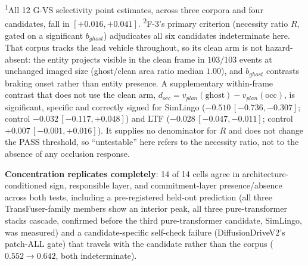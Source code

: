 \begin{table}[t]
\centering
\caption{Portability across a structurally different scenario (lead-vehicle braking) and
an independently collected data source (NAVSIM).}
\label{tab:generality}
\scriptsize
{}

\vspace{4pt}
{\scriptsize\textsuperscript{1}All 12 G-VS selectivity point estimates, across three corpora and four candidates, fall in $[+0.016,+0.041]$. \textsuperscript{2}F-3's primary criterion (necessity ratio $R$, gated on a significant $b_{ghost}$) adjudicates all six candidates indeterminate here. That corpus tracks the lead vehicle throughout, so its clean arm is not hazard-absent: the entity projects visible in the clean frame in $103/103$ events at unchanged imaged size (ghost/clean area ratio median $1.00$), and $b_{ghost}$ contrasts braking onset rather than entity presence. A supplementary within-frame contrast that does not use the clean arm, $d_{occ}=v_{plan}(\text{ghost})-v_{plan}(\text{occ})$, is significant, specific and correctly signed for SimLingo ($-0.510\,[-0.736,-0.307]$; control $-0.032\,[-0.117,+0.048]$) and LTF ($-0.028\,[-0.047,-0.011]$; control $+0.007\,[-0.001,+0.016]$). It supplies no denominator for $R$ and does not change the PASS threshold, so ``untestable'' here refers to the necessity ratio, not to the absence of any occlusion response.}
\end{table}

\textbf{Concentration replicates completely}: 14 of 14 cells agree in
architecture-conditioned sign, responsible layer, and commitment-layer presence/absence
across both tests, including a pre-registered held-out prediction (all three
TransFuser-family members show an interior peak, all three pure-transformer stacks
cascade, confirmed before the third pure-transformer candidate, SimLingo, was measured)
and a candidate-specific self-check failure (DiffusionDriveV2's patch-ALL gate) that
travels with the candidate rather than the corpus ($0.552\to0.642$, both indeterminate).

